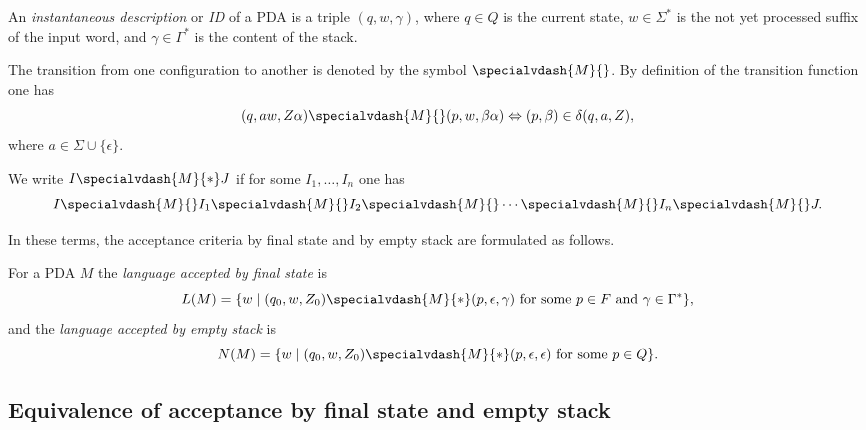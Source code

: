 \begin{page}
\setcounter{section}{6}
\setcounter{subsection}{2}
\setcounter{dfn}{6}
\label{portion:1127}

\begin{dfn}
An \emph{instantaneous description} or \emph{ID} of a PDA is a triple $(q, w, \gamma)$,
where $q \in Q$ is the current state, $w \in \Sigma^*$ is the not yet processed suffix of the input word,
and $\gamma \in \Gamma^*$ is the content of the stack.
\end{dfn}

\end{page}

\begin{page}
\setcounter{section}{6}
\setcounter{subsection}{2}
\setcounter{dfn}{6}
\label{portion:1128}


The transition from one configuration to another is denoted by the symbol $\specialvdash{M}{}$.
By definition of the transition function one has
\[
(q, aw, Z\alpha) \specialvdash{M}{} (p, w, \beta\alpha) \Leftrightarrow (p, \beta) \in \delta(q, a, Z),
\]
where $a \in \Sigma \cup \{\epsilon\}$.

We write $I \specialvdash{M}{*} J$ if for some $I_1, \ldots, I_n$ one has
\[
I \specialvdash{M}{} I_1 \specialvdash{M}{} I_2 \specialvdash{M}{} \cdots \specialvdash{M}{} I_n \specialvdash{M}{} J.
\]

In these terms, the acceptance criteria by final state and by empty stack are formulated as follows.


\end{page}

\begin{page}
\setcounter{section}{6}
\setcounter{subsection}{2}
\setcounter{dfn}{7}
\label{portion:1130}

\begin{dfn}
For a PDA $M$ the \emph{language accepted by final state} is
\[
L(M) = \{w \mid (q_0, w, Z_0) \specialvdash{M}{*} (p, \epsilon, \gamma) \text{ for some }p \in F \text{ and } \gamma \in \Gamma^*\},
\]
and the \emph{language accepted by empty stack} is
\[
N(M) = \{w \mid (q_0, w, Z_0) \specialvdash{M}{*} (p, \epsilon, \epsilon) \text{ for some }p \in Q\}.
\]
\end{dfn}

\end{page}

\begin{page}
\setcounter{section}{6}
\setcounter{subsection}{3}
\setcounter{dfn}{7}
\label{portion:1132}

\subsection{Equivalence of acceptance by final state and empty stack}

\end{page}


